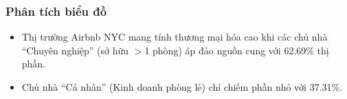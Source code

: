 \subsubsection{Phân tích biểu đồ}

\begin{itemize}
    \item Thị trường Airbnb NYC mang tính thương mại hóa cao khi các chủ nhà ``Chuyên nghiệp'' (sở hữu $>$1 phòng) áp đảo nguồn cung với 62.69\% thị phần.
    \item Chủ nhà ``Cá nhân'' (Kinh doanh phòng lẻ) chỉ chiếm phần nhỏ với 37.31\%.
\end{itemize}
